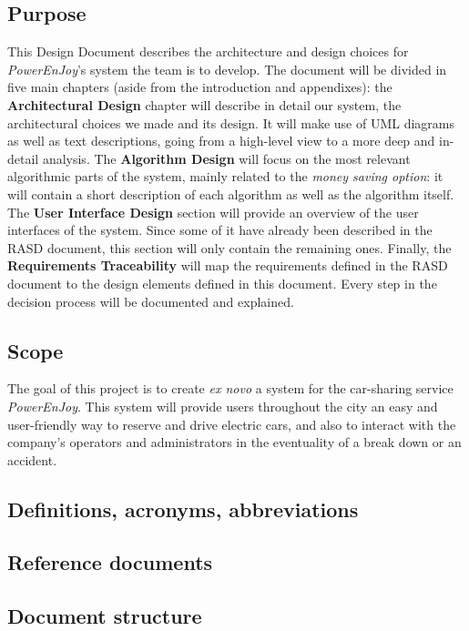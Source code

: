 \subsection{Purpose}
This Design Document describes the architecture and design choices for \textit{PowerEnJoy}'s system the team is to develop. The document will be divided in five main chapters (aside from the introduction and appendixes): the \textbf{Architectural Design} chapter will describe in detail our system, the architectural choices we made and its design. It will make use of UML diagrams as well as text descriptions, going from a high-level view to a more deep and in-detail analysis. The \textbf{Algorithm Design} will focus on the most relevant algorithmic parts of the system, mainly related to the \textit{money saving option}: it will contain a short description of each algorithm as well as the algorithm itself. 
The \textbf{User Interface Design} section will provide an overview of the user interfaces of the system. Since some of it have already been described in the RASD document, this section will only contain the remaining ones. 
Finally, the \textbf{Requirements Traceability} will map the requirements defined in the RASD document to the design elements defined in this document.
Every step in the decision process will be documented and explained.

\subsection{Scope}
The goal of this project is to create \textit{ex novo} a system for the car-sharing service \textit{PowerEnJoy}. This system will provide users throughout the city an easy and user-friendly way to reserve and drive electric cars, and also to interact with the company's operators and administrators in the eventuality of a break down or an accident.

\subsection{Definitions, acronyms, abbreviations}

\subsection{Reference documents}

\subsection{Document structure}
